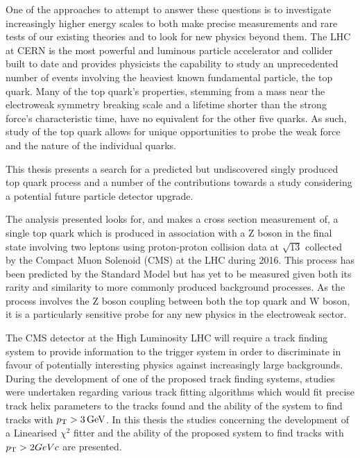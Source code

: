 One of the approaches to attempt to answer these questions is to investigate increasingly higher energy scales to both make precise measurements and rare tests of our existing theories and to look for new physics beyond them.
The LHC at CERN is the most powerful and luminous particle accelerator and collider built to date and provides physicists the capability to study an unprecedented number of events involving the heaviest known fundamental particle, the top quark.
Many of the top quark's properties, stemming from a mass near the electroweak symmetry breaking scale and a lifetime shorter than the strong force’s characteristic time, have no equivalent for the other five quarks.
As such, study of the top quark allows for unique opportunities to probe the weak force and the nature of the individual quarks.

This thesis presents a search for a predicted but undiscovered singly produced top quark process and a number of the contributions towards a study considering a potential future particle detector upgrade.

The analysis presented looks for, and makes a cross section measurement of, a single top quark which is produced in association with a Z boson in the final state involving two leptons using proton-proton collision data at $\sqrt{13}$ collected by the Compact Muon Solenoid (CMS) at the LHC during 2016.
This process has been predicted by the Standard Model but has yet to be measured given both its rarity and similarity to more commonly produced background processes.
As the process involves the Z boson coupling between both the top quark and W boson, it is a particularly sensitive probe for any new physics in the electroweak sector.

The CMS detector at the High Luminosity LHC will require a track finding system to provide information to the trigger system in order to discriminate in favour of potentially interesting physics against increasingly large backgrounds.
During the development of one of the proposed track finding systems, studies were undertaken regarding various track fitting algorithms which would fit precise track helix parameters to the tracks found and the ability of the system to find tracks with $p_{\mathrm{T}} > 3\,\text{Ge\hspace{-.08em}V}$.
In this thesis the studies concerning the development of a Linearised $\chi^{2}$ fitter and the ability of the proposed system to find tracks with $p_{\mathrm{T}} > 2GeVc$ are presented.


